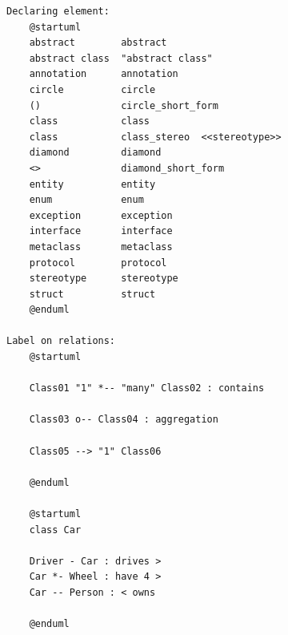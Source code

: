 \begin{lstlisting}[caption={Zero-shot prompt}, label={lst:zero_shot},basicstyle=\ttfamily\tiny]
Declaring element:
    @startuml
    abstract        abstract
    abstract class  "abstract class"
    annotation      annotation
    circle          circle
    ()              circle_short_form
    class           class
    class           class_stereo  <<stereotype>>
    diamond         diamond
    <>              diamond_short_form
    entity          entity
    enum            enum
    exception       exception
    interface       interface
    metaclass       metaclass
    protocol        protocol
    stereotype      stereotype
    struct          struct
    @enduml

Label on relations:
    @startuml

    Class01 "1" *-- "many" Class02 : contains

    Class03 o-- Class04 : aggregation

    Class05 --> "1" Class06

    @enduml

    @startuml
    class Car

    Driver - Car : drives >
    Car *- Wheel : have 4 >
    Car -- Person : < owns

    @enduml


\end{lstlisting}


